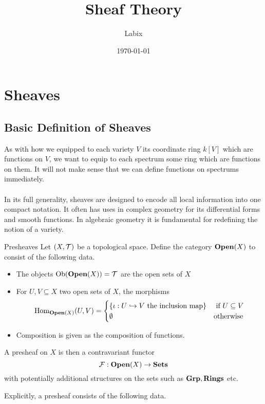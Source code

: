 \documentclass[a4paper]{article}
\title{Sheaf Theory}
\author{Labix}
\date{\today}
\begin{document}
\maketitle
\begin{abstract}
\end{abstract}
\pagebreak
\tableofcontents
\pagebreak

\section{Sheaves}
\subsection{Basic Definition of Sheaves}
As with how we equipped to each variety $V$ its coordinate ring $k[V]$ which are functions on $V$, we want to equip to each spectrum some ring which are functions on them. It will not make sense that we can define functions on spectrums immediately. \\~\\

In its full generality, sheaves are designed to encode all local information into one compact notation. It often has uses in complex geometry for its differential forms and smooth functions. In algebraic geometry it is fundamental for redefining the notion of a variety. 

\begin{defn}{Presheaves}{} Let $(X,\mathcal{T})$ be a topological space. Define the category $\bold{Open}(X)$ to consist of the following data. 
\begin{itemize}
\item The objects $\text{Ob}(\bold{Open}(X))=\mathcal{T}$ are the open sets of $X$
\item For $U,V\subseteq X$ two open sets of $X$, the morphisms $$\operatorname{Hom}_{\bold{Open}(X)}(U,V)=\begin{cases}
\{\iota:U\hookrightarrow V\text{ the inclusion map}\} & \text{ if } U\subseteq V\\
\emptyset & \text{otherwise}
\end{cases}$$
\item Composition is given as the composition of functions. 
\end{itemize}
A presheaf on $X$ is then a contravariant functor $$\mathcal{F}:\bold{Open}(X)\to\bold{Sets}$$ with potentially additional structures on the sets such as $\bold{Grp},\bold{Rings}$ etc. 
\end{defn}

Explicitly, a presheaf consists of the following data. 
\end{document}
